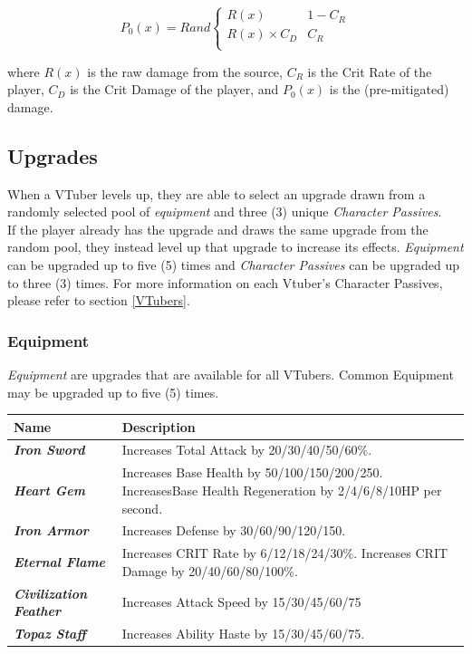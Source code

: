 \documentclass[10pt, a4paper]{article}
\begin{document}
\begin{multicols}{2}
\begin{itemize}
  	 \[
	  	 P_0(x) = Rand\begin{cases}
	  	 	R(x) & 1 - C_R\\
	  	 	R(x) \times C_D & C_R \\
	  	 \end{cases}
  	 \]
  	 
  	 where $R(x)$ is the raw damage from the source, $C_R$ is the Crit Rate of the player, $C_D$ is the Crit Damage of the player, and $P_0(x)$ is the (pre-mitigated) damage.
  	 
  	\end{itemize}
  	
  	\subsection{Upgrades} \label{Upgrades}
  	
  	When a VTuber levels up, they are able to select an upgrade drawn from a randomly selected pool of \textit{equipment} and three (3) unique \textit{Character Passives}. \\
  	
  	If the player already has the upgrade and draws the same upgrade from the random pool, they instead level up that upgrade to increase its effects. \textit{Equipment} can be upgraded up to five (5) times and \textit{Character Passives} can be upgraded up to three (3) times. For more information on each Vtuber's Character Passives, please refer to section \ref{VTubers}.
	
  	\subsubsection{Equipment}
  	
  	\textit{Equipment} are upgrades that are available for all VTubers. Common Equipment may be upgraded up to five (5) times.
  	
  	\begin{center}
		\begin{tabular}{|p{2.7cm}|p{5.5cm}|}
			\hline
			\textbf{Name} & \textbf{Description} \\
			\hline
			\textit{\textbf{Iron Sword}} & Increases Total Attack by 20/30/40/50/60\%. \\
			\textit{\textbf{Heart Gem}} & Increases Base Health by 50/100/150/200/250. IncreasesBase Health Regeneration by 2/4/6/8/10HP per second. \\
			\textit{\textbf{Iron Armor}} & Increases Defense by 30/60/90/120/150. \\
			\textit{\textbf{Eternal Flame}} & Increases CRIT Rate by 6/12/18/24/30\%. Increases CRIT Damage by 20/40/60/80/100\%. \\
			\textit{\textbf{Civilization Feather}} & Increases Attack Speed by 15/30/45/60/75%
			\\
			\textit{\textbf{Topaz Staff}} & Increases Ability Haste by 15/30/45/60/75.
			\\
			\hline
		\end{tabular}
	\end{center}


\end{multicols}
\end{document}
